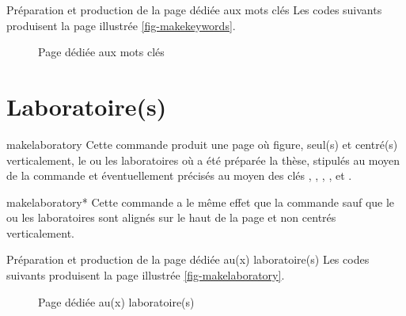 \begin{dbexample}{Préparation et production de la page dédiée aux mots clés}{}
  Les codes suivants produisent la page illustrée \vref{fig-makekeywords}.
\end{dbexample}

\begin{figure}[htbp]
  \centering
  \caption{Page dédiée aux mots clés}
  \label{fig-makekeywords}
\end{figure}

\section{Laboratoire(s)}
\label{sec-laboratoires}

\begin{docCommand}{makelaboratory}{}
  Cette commande produit une page où figure, seul(s) et centré(s)
  verticalement, le ou les laboratoires où a été préparée la thèse, stipulés au
  moyen de la commande  et éventuellement précisés au moyen
  des clés , , ,
  ,  et .
\end{docCommand}
%
\begin{docCommand}{makelaboratory*}{}
  Cette commande a le même effet que la commande  sauf
  que le ou les laboratoires sont alignés sur le haut de la page et non centrés
  verticalement.
\end{docCommand}

\begin{dbexample}{Préparation et production de la page dédiée au(x) laboratoire(s)}{}
  Les codes suivants produisent la page illustrée \vref{fig-makelaboratory}.
  \NoAutoSpacing%
\end{dbexample}

\begin{figure}[htbp]
  \centering
  \caption{Page dédiée au(x) laboratoire(s)}
  \label{fig-makelaboratory}
\end{figure}

